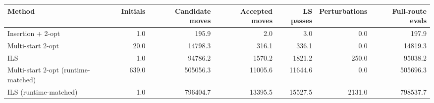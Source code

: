 \begin{tabular}{lrrrrrr}
\toprule
Method & Initials & Candidate moves & Accepted moves & LS passes & Perturbations & Full-route evals \\
\midrule
Insertion + 2-opt & 1.0 & 195.9 & 2.0 & 3.0 & 0.0 & 197.9 \\
Multi-start 2-opt & 20.0 & 14798.3 & 316.1 & 336.1 & 0.0 & 14819.3 \\
ILS & 1.0 & 94786.2 & 1570.2 & 1821.2 & 250.0 & 95038.2 \\
Multi-start 2-opt (runtime-matched) & 639.0 & 505056.3 & 11005.6 & 11644.6 & 0.0 & 505696.3 \\
ILS (runtime-matched) & 1.0 & 796404.7 & 13395.5 & 15527.5 & 2131.0 & 798537.7 \\
\bottomrule
\end{tabular}
